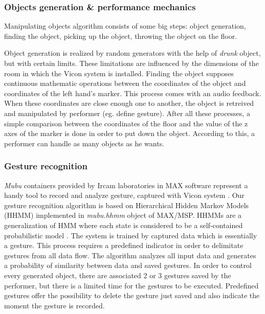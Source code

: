 \documentclass{nime-alternate}
\begin{document}
\subsubsection{Objects generation \& performance mechanics}
Manipulating objects algorithm consists of some big steps: object generation, finding the object, picking up the object, throwing the object on the floor. 

Object generation is realized by random generators with the help of \textit{drunk} object, but with certain limits. These limitations are influenced by the dimensions of the room in which the Vicon system is installed. Finding the object supposes continuous mathematic operations between the coordinates of the object and coordinates of the left hand's marker. This process comes with an audio feedback. When these coordinates are close enough one to another, the object is retreived and manipulated by performer (eg. define gesture). After all these processes, a simple comparison between the coordinates of the floor and the value of the z axes of the marker is done in order to put down the object. According to this, a performer can handle as many objects as he wants.\\ \par


\subsubsection{Gesture recognition}

 \textit{Mubu} containers provided by Ircam laboratories in MAX software represent a handy tool to record and analyze gesture, captured with Vicon system \cite{mubu}. Our gesture recognition algorithm is based on Hierarchical Hidden Markov Models (HHMM) implemented in \textit{mubu.hhmm} object of MAX/MSP. HHMMs are a generalization of HMM where each state is considered to be a self-contained probabilistic model \cite{hhmm}. The system is trained by captured data which is essentially a gesture. This process requires a predefined indicator in order to delimitate gestures from all data flow. The algorithm analyzes all input data and generates a probability of similarity between data and saved gestures. In order to control every generated object, there are associated 2 or 3 gestures saved by the performer, but there is a limited time for the gestures to be executed. Predefined gestures offer the possibility to delete the gesture just saved and also indicate the moment the gesture is recorded.
\end{document}
